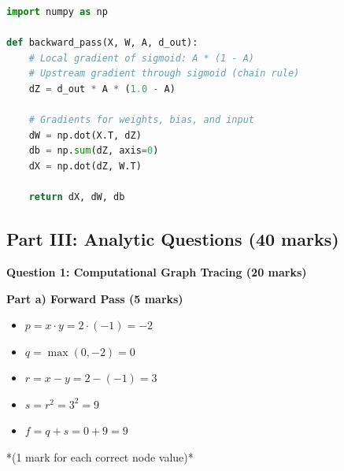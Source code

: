 \documentclass[11pt]{article}
\begin{document}
\begin{lstlisting}[language=Python]
import numpy as np

def backward_pass(X, W, A, d_out):
    # Local gradient of sigmoid: A * (1 - A)
    # Upstream gradient through sigmoid (chain rule)
    dZ = d_out * A * (1.0 - A)
    
    # Gradients for weights, bias, and input
    dW = np.dot(X.T, dZ)
    db = np.sum(dZ, axis=0)
    dX = np.dot(dZ, W.T)
    
    return dX, dW, db
\end{lstlisting}

\subsection*{Part III: Analytic Questions (40 marks)}

\textbf{Question 1: Computational Graph Tracing (20 marks)}

\textbf{Part a) Forward Pass (5 marks)}
\begin{itemize}
    \item $p = x \cdot y = 2 \cdot (-1) = -2$
    \item $q = \max(0, -2) = 0$
    \item $r = x - y = 2 - (-1) = 3$
    \item $s = r^2 = 3^2 = 9$
    \item $f = q + s = 0 + 9 = 9$
\end{itemize}
*(1 mark for each correct node value)*
\end{document}
